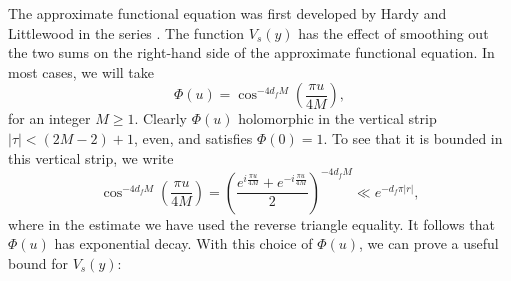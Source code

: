     The approximate functional equation was first developed by Hardy and Littlewood in the series \cite{hardyzeros1921,hardyapproximate1923,hardyapproximate1929}. The function $V_{s}(y)$ has the effect of smoothing out the two sums on the right-hand side of the approximate functional equation. In most cases, we will take
    \[
      \Phi(u) = \cos^{-4d_{f}M}\left(\frac{\pi u}{4M}\right),
    \]
    for an integer $M \ge 1$. Clearly $\Phi(u)$ holomorphic in the vertical strip $|\tau| < (2M-2)+1$, even, and satisfies $\Phi(0) = 1$. To see that it is bounded in this vertical strip, we write
    \begin{equation}\label{equ:choice_for_V_decay_estimate}
     \cos^{-4d_{f}M}\left(\frac{\pi u}{4M}\right) = \left(\frac{e^{i\frac{\pi u}{4M}}+e^{-i\frac{\pi u}{4M}}}{2}\right)^{-4d_{f}M} \ll e^{-d_{f}\pi|r|},
    \end{equation}
    where in the estimate we have used the reverse triangle equality. It follows that $\Phi(u)$ has exponential decay. With this choice of $ \Phi(u)$, we can prove a useful bound for $V_{s}(y)$:

